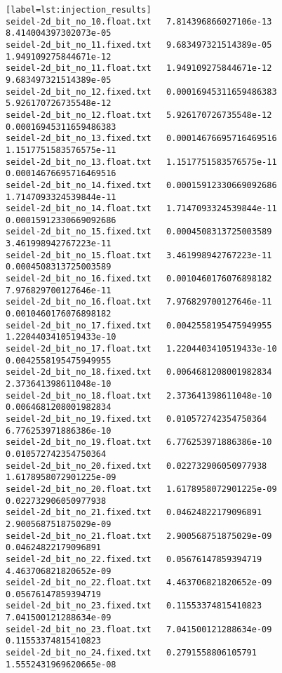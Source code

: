 \begin{verbatim}[label=lst:injection_results]
seidel-2d_bit_no_10.float.txt   7.814396866027106e-13                   8.414004397302073e-05
seidel-2d_bit_no_11.fixed.txt   9.683497321514389e-05                   1.949109275844671e-12
seidel-2d_bit_no_11.float.txt   1.949109275844671e-12                   9.683497321514389e-05
seidel-2d_bit_no_12.fixed.txt   0.00016945311659486383                  5.926170726735548e-12
seidel-2d_bit_no_12.float.txt   5.926170726735548e-12                   0.00016945311659486383
seidel-2d_bit_no_13.fixed.txt   0.00014676695716469516                  1.1517751583576575e-11
seidel-2d_bit_no_13.float.txt   1.1517751583576575e-11                  0.00014676695716469516
seidel-2d_bit_no_14.fixed.txt   0.00015912330669092686                  1.7147093324539844e-11
seidel-2d_bit_no_14.float.txt   1.7147093324539844e-11                  0.00015912330669092686
seidel-2d_bit_no_15.fixed.txt   0.0004508313725003589                   3.461998942767223e-11
seidel-2d_bit_no_15.float.txt   3.461998942767223e-11                   0.0004508313725003589
seidel-2d_bit_no_16.fixed.txt   0.0010460176076898182                   7.976829700127646e-11
seidel-2d_bit_no_16.float.txt   7.976829700127646e-11                   0.0010460176076898182
seidel-2d_bit_no_17.fixed.txt   0.0042558195475949955                   1.2204403410519433e-10
seidel-2d_bit_no_17.float.txt   1.2204403410519433e-10                  0.0042558195475949955
seidel-2d_bit_no_18.fixed.txt   0.0064681208001982834                   2.373641398611048e-10
seidel-2d_bit_no_18.float.txt   2.373641398611048e-10                   0.0064681208001982834
seidel-2d_bit_no_19.fixed.txt   0.010572742354750364                    6.776253971886386e-10
seidel-2d_bit_no_19.float.txt   6.776253971886386e-10                   0.010572742354750364
seidel-2d_bit_no_20.fixed.txt   0.022732906050977938                    1.6178958072901225e-09
seidel-2d_bit_no_20.float.txt   1.6178958072901225e-09                  0.022732906050977938
seidel-2d_bit_no_21.fixed.txt   0.04624822179096891                     2.900568751875029e-09
seidel-2d_bit_no_21.float.txt   2.900568751875029e-09                   0.04624822179096891
seidel-2d_bit_no_22.fixed.txt   0.05676147859394719                     4.463706821820652e-09
seidel-2d_bit_no_22.float.txt   4.463706821820652e-09                   0.05676147859394719
seidel-2d_bit_no_23.fixed.txt   0.11553374815410823                     7.041500121288634e-09
seidel-2d_bit_no_23.float.txt   7.041500121288634e-09                   0.11553374815410823
seidel-2d_bit_no_24.fixed.txt   0.2791558806105791                      1.5552431969620665e-08

\end{verbatim}
